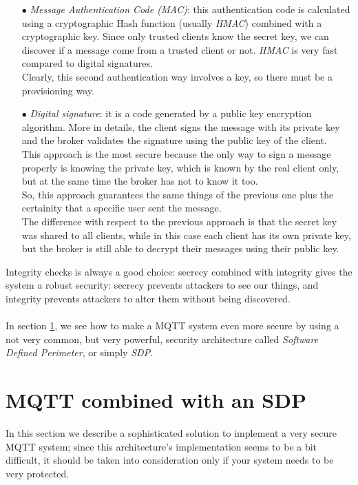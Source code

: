 \documentclass[12pt]{report}
\begin{document}
{{\begin{itemize}
\item[$\bullet$] \emph{Message Authentication Code (MAC)}: this authentication code is calculated using a cryptographic Hash function (usually \emph{HMAC}) combined with a cryptographic key. Since only trusted clients know the secret key, we can discover if a message come from a trusted client or not. \emph{HMAC} is very fast compared to digital signatures.\\
Clearly, this second authentication way involves a key, so there must be a provisioning way.

\item[$\bullet$] \emph{Digital signature}: it is a code generated by a public key encryption algorithm. More in details, the client signs the message with its private key and the broker validates the signature using the public key of the client.\\
This approach is the most secure because the only way to sign a message properly is knowing the private key, which is known by the real client only, but at the same time the broker has not to know it too.\\
So, this approach guarantees the same things of the previous one plus the certainity that a specific user sent the message.\\
The difference with respect to the previous approach is that the secret key was shared to all clients, while in this case each client has its own private key, but the broker is still able to decrypt their messages using their public key.\\
\end{itemize}

Integrity checks is always a good choice: secrecy combined with integrity gives the system a robust security: secrecy prevents attackers to see our things, and integrity prevents attackers to alter them without being discovered.\\\\
In section \ref{sec:mqttsdp}, we see how to make a MQTT system even more secure by using a not very common, but very powerful, security architecture called \emph{Software Defined Perimeter}, or simply \emph{SDP}.\\


\section{MQTT combined with an SDP}
\label{sec:mqttsdp}
\bigskip
In this section we describe a sophisticated solution to implement a very secure MQTT system; since this architecture's implementation seems to be a bit difficult, it should be taken into consideration only if your system needs to be very protected.\\

}}
\end{document}
